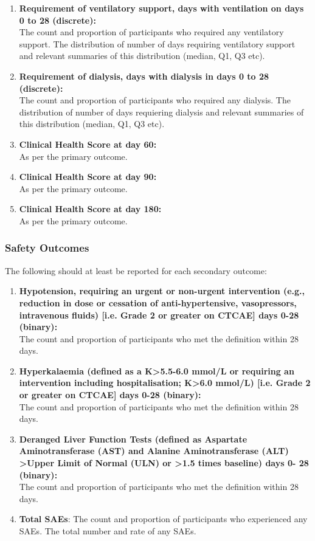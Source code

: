 \documentclass[11pt,parskip=half-]{scrartcl}
\begin{document}
\begin{enumerate}
    \item \textbf{Requirement of ventilatory support, days with ventilation on days 0 to 28 (discrete):} \\
        The count and proportion of participants who required any ventilatory support. The distribution of number of days requiring ventilatory support and relevant summaries of this distribution (median, Q1, Q3 etc).
    \item \textbf{Requirement of dialysis, days with dialysis in days 0 to 28 (discrete):} \\
        The count and proportion of participants who required any dialysis. The distribution of number of days requiering dialysis and relevant summaries of this distribution (median, Q1, Q3 etc).
    \item \textbf{Clinical Health Score at day 60:} \\
        As per the primary outcome.
    \item \textbf{Clinical Health Score at day 90:} \\
        As per the primary outcome.
    \item \textbf{Clinical Health Score at day 180:} \\
        As per the primary outcome.
\end{enumerate}

\subsubsection{Safety Outcomes}

The following should at least be reported for each secondary outcome:

\begin{enumerate}[resume]
    \item \textbf{Hypotension, requiring an urgent or non-urgent intervention (e.g., reduction in dose or cessation of anti-hypertensive, vasopressors, intravenous fluids) [i.e. Grade 2 or greater on CTCAE] days 0-28 (binary):} \\
        The count and proportion of participants who met the definition within 28 days.
    \item  \textbf{Hyperkalaemia (defined as a K>5.5-6.0 mmol/L or requiring an intervention including hospitalisation; K>6.0 mmol/L) [i.e. Grade 2 or greater on CTCAE] days 0-28 (binary):} \\ 
        The count and proportion of participants who met the definition within 28 days.
    \item \textbf{Deranged Liver Function Tests (defined as Aspartate Aminotransferase (AST) and Alanine Aminotransferase (ALT) >Upper Limit of Normal (ULN) or >1.5 times baseline) days 0- 28 (binary):} \\
        The count and proportion of participants who met the definition within 28 days.
    \item \textbf{Total SAEs}:
        The count and proportion of participants who experienced any SAEs. The total number and rate of any SAEs.
\end{enumerate}
\end{document}
